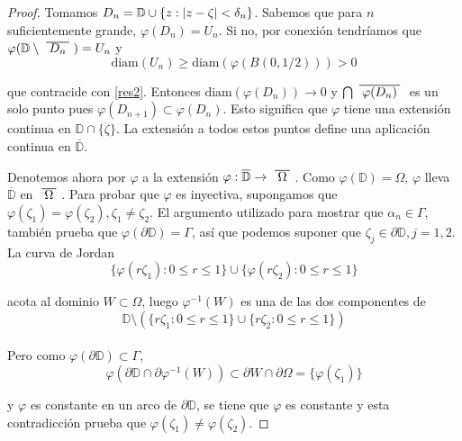 \begin{proof}
    Tomamos $D_n = \mathbb{D} \cup \{ z: \left\lvert z - \zeta\right\rvert < \delta_n \}$. Sabemos que para $n$ suficientemente grande, $\varphi(D_n) = U_n$. Si no, por conexión tendríamos que $\varphi(\mathbb{D} \setminus \xbar{D_n}) = U_n$ y
    \begin{equation*}
        \text{diam} (U_n) \geq \text{diam} (\varphi(B(0, 1/2))) > 0
    \end{equation*}

    que contracide con \ref{res2}. Entonces $\text{diam}(\varphi(D_n)) \rightarrow 0$ y $\bigcap \xbar{\varphi(D_n)}$ es un solo punto pues $\varphi(D_{n+1}) \subset \varphi(D_n)$. Esto significa que $\varphi$ tiene una extensión continua en $\mathbb{D} \cap \{ \zeta \}$. La extensión a todos estos puntos define una aplicación continua en $\overline{\mathbb{D}}$.

    Denotemos ahora por $\varphi$ a la extensión $\varphi : \overline{\mathbb{D}} \rightarrow \xbar{\Omega}$. Como $\varphi(\mathbb{D}) = \Omega$, $\varphi$ lleva  $\overline{\mathbb{D}}$ en $\xbar{\Omega}$. Para probar que $\varphi$ es inyectiva, supongamos que $\varphi(\zeta_1) = \varphi(\zeta_2), \zeta_1 \not = \zeta_2$. El argumento utilizado para mostrar que $\alpha_n \in \Gamma$, también prueba que $\varphi (\partial \mathbb{D}) = \Gamma$, así que podemos suponer que $\zeta_j \in \partial \mathbb{D}, j=1,2$. La curva de Jordan
    \begin{equation*}
        \{\varphi (r \zeta_1) : 0 \leq r \leq 1\} \cup \{\varphi (r \zeta_2) : 0 \leq r \leq 1\}
    \end{equation*}

    acota al dominio $W \subset \Omega$, luego $\varphi ^{-1} (W)$ es una de las dos componentes de
    \begin{equation*}
        \mathbb{D} \setminus ( \{ r \zeta_1 : 0 \leq r \leq 1\} \cup \{ r \zeta_2 : 0 \leq r \leq 1\})
    \end{equation*}
    \\
    Pero como $\varphi(\partial \mathbb{D}) \subset \Gamma$,
    \begin{equation*}
        \varphi(\partial \mathbb{D} \cap \partial \varphi ^{-1} (W)) \subset \partial W \cap \partial \Omega = \{ \varphi (\zeta_1)\}
    \end{equation*}

    y $\varphi$ es constante en un arco de $\partial \mathbb{D}$, se tiene que $\varphi$ es constante y esta contradicción prueba que $\varphi(\zeta_1) \not = \varphi(\zeta_2)$.
\end{proof}

